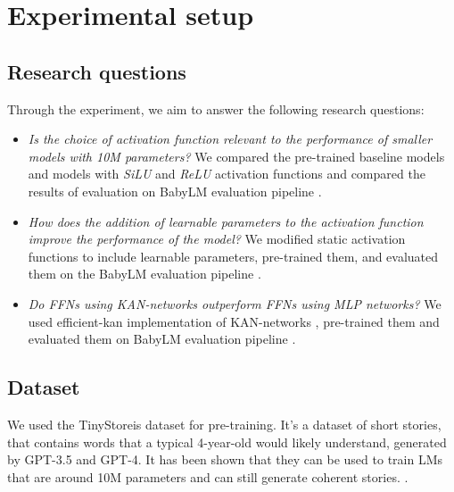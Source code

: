 
\section{Experimental setup} %
\label{sec:experimental_setup}

\subsection{Research questions}
Through the experiment, we aim to answer the following research questions:
\begin{itemize}
    \item \textit{Is the choice of activation function relevant to the performance of smaller models with 10M parameters?}  We compared the pre-trained baseline models and models with \textit{SiLU} and \textit{ReLU} activation functions and compared the results of evaluation on BabyLM evaluation pipeline \cite{Warstadt2023}.
    \item \textit{How does the addition of learnable parameters to the activation function improve the performance of the model?} We modified static activation functions to include learnable parameters, pre-trained them, and evaluated them on the BabyLM evaluation pipeline \cite{Warstadt2023}.
    \item \textit{Do FFNs using KAN-networks outperform FFNs using MLP networks?} We used efficient-kan implementation of KAN-networks \cite{efficient-kan}, pre-trained them and evaluated them on BabyLM evaluation pipeline \cite{Warstadt2023}.
\end{itemize}
\subsection{Dataset}
We used the TinyStoreis dataset for pre-training. It's a dataset of short stories, that contains words that a typical 4-year-old would likely understand, generated by GPT-3.5 and GPT-4. It has been shown that they can be used to train LMs that are around 10M parameters and can still generate coherent stories. \cite{Eldan2023}.

